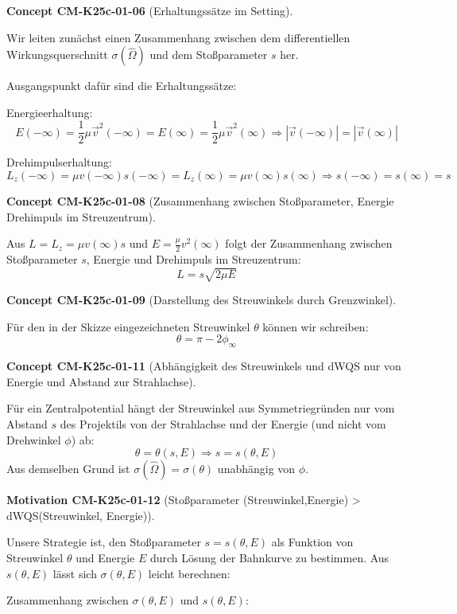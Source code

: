 \documentclass[10pt, letterpaper]{article}
\newcommand{\CustomHeading}[3]{%
  \par\medskip\noindent%
  \textbf{#1 #2} \textnormal{(#3)}.\enskip%
}
\newenvironment{CONC}[2]{\begin{unitbox}\CustomHeading{Concept}{#1}{#2}}{\end{unitbox}}
\newenvironment{MOT}[2]{\begin{unitbox}\CustomHeading{Motivation}{#1}{#2}}{\end{unitbox}}
\begin{document}
\begin{CONC}{CM-K25c-01-06}{Erhaltungssätze im Setting}
Wir leiten zunächst einen Zusammenhang zwischen dem differentiellen Wirkungsquerschnitt $\sigma(\hat{\Omega})$ und dem Stoßparameter $s$ her. 

Ausgangspunkt dafür sind die Erhaltungssätze:

Energieerhaltung:
\[
E(-\infty) = \frac{1}{2}\mu\vec{v}^2(-\infty) = E(\infty) = \frac{1}{2}\mu\vec{v}^2(\infty) \Rightarrow |\vec{v}(-\infty)| = |\vec{v}(\infty)|
\]

Drehimpulserhaltung:
\[
L_z(-\infty) = \mu v(-\infty)s(-\infty) = L_z(\infty) = \mu v(\infty)s(\infty) \Rightarrow s(-\infty) = s(\infty) = s
\]
\end{CONC}


\begin{CONC}{CM-K25c-01-08}{Zusammenhang zwischen Stoßparameter, Energie Drehimpuls im Streuzentrum}
Aus $L=L_z = \mu v(\infty)s$ und $E = \frac{\mu}{2}v^2(\infty)$ folgt der Zusammenhang zwischen Stoßparameter $s$, Energie und Drehimpuls im Streuzentrum:
\[
L = s\sqrt{2\mu E}
\]
\end{CONC}


\begin{CONC}{CM-K25c-01-09}{Darstellung des Streuwinkels durch Grenzwinkel}
Für den in der Skizze eingezeichneten Streuwinkel $\theta$ können wir schreiben:
$$\theta = \pi - 2\phi_{\infty}$$
\end{CONC}

\begin{CONC}{CM-K25c-01-11}{Abhängigkeit des Streuwinkels und dWQS nur von Energie und Abstand zur Strahlachse}
Für ein Zentralpotential hängt der Streuwinkel aus Symmetriegründen nur vom Abstand $s$ des Projektils von der Strahlachse und der Energie (und nicht vom Drehwinkel $\phi$) ab:
\[
\theta = \theta(s,E) \Rightarrow s = s(\theta,E)
\]
Aus demselben Grund ist $\sigma(\hat{\Omega}) = \sigma(\theta)$ unabhängig von $\phi$.
\end{CONC}


\begin{MOT}{CM-K25c-01-12}{Stoßparameter (Streuwinkel,Energie) > dWQS(Streuwinkel, Energie)}
Unsere Strategie ist, den Stoßparameter $s = s(\theta,E)$ als Funktion von Streuwinkel $\theta$ und Energie $E$ durch Lösung der Bahnkurve zu bestimmen. Aus $s(\theta,E)$ lässt sich $\sigma(\theta,E)$ leicht berechnen:
\end{MOT}


Zusammenhang zwischen $\sigma(\theta,E)$ und $s(\theta,E)$:
\end{document}
